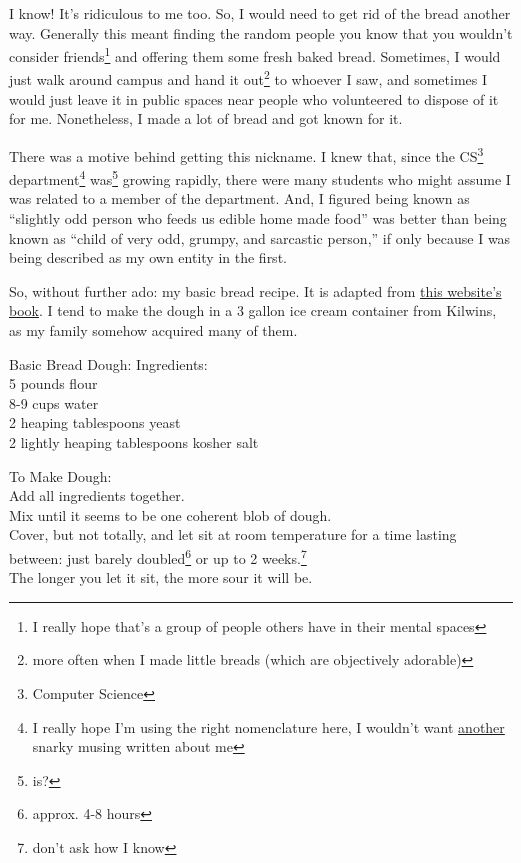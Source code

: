 \documentclass[12pt]{article}[titlepage]
\newcommand{\say}[1]{``#1''}
\newcommand{\1}{\={a}}
\newcommand{\2}{\={e}}
\newcommand{\3}{\={\i}}
\newcommand{\4}{\=o}
\newcommand{\5}{\=u}
\newcommand{\6}{\={A}}
\renewcommand{\,}{\textsuperscript{,}}
\begin{document}
I know!
It's ridiculous to me too.
So, I would need to get rid of the bread another way.
Generally this meant finding the random people you know that you wouldn't consider friends\footnote{I really hope that's a group of people others have in their mental spaces} and offering them some fresh baked bread.
Sometimes, I would just walk around campus and hand it out\footnote{more often when I made little breads (which are objectively adorable)} to whoever I saw, and sometimes I would just leave it in public spaces near people who volunteered to dispose of it for me.
Nonetheless, I made a lot of bread and got known for it.

There was a motive behind getting this nickname.
I knew that, since the CS\footnote{Computer Science} department\footnote{I really hope I'm using the right nomenclature here, I wouldn't want \href{http://www.cs.grinnell.edu/~rebelsky/musings/busses-bussing}{another} snarky musing written about me} was\footnote{is?} growing rapidly, there were many students who might assume I was related to a member of the department.
And, I figured being known as \say{slightly odd person who feeds us edible home made food} was better than being known as \say{child of very odd, grumpy, and sarcastic person,} if only because I was being described as my own entity in the first.

So, without further ado: my basic bread recipe.
It is adapted from \href{https://artisanbreadinfive.com}{this website's book}.
I tend to make the dough in a 3 gallon ice cream container from Kilwins, as my family somehow acquired many of them.

Basic Bread Dough:
Ingredients:\\
5 pounds flour\\
8-9 cups water\\
2 heaping tablespoons yeast\\
2 lightly heaping tablespoons kosher salt

To Make Dough:\\
Add all ingredients together.\\
Mix until it seems to be one coherent blob of dough.\\
Cover, but not totally, and let sit at room temperature for a time lasting between: just barely doubled\footnote{approx. 4-8 hours} or up to 2 weeks.\footnote{don't ask how I know}\\
The longer you let it sit, the more sour it will be.
\end{document}
